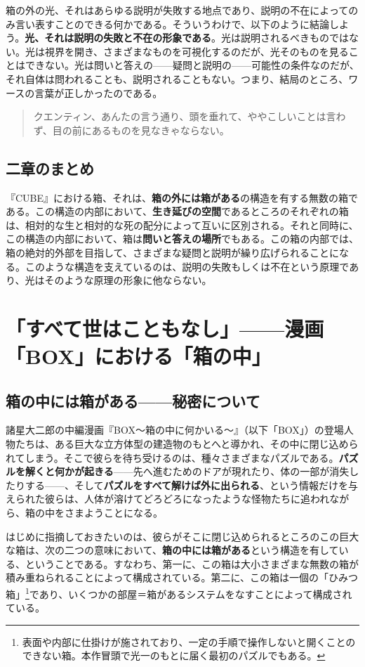 \documentclass[9pt,b5j,twoside,twocolumn]{utarticle}
\begin{document}
箱の外の光、それはあらゆる説明が失敗する地点であり、説明の不在によってのみ言い表すことのできる何かである。そういうわけで、以下のように結論しよう。\textbf{光、それは説明の失敗と不在の形象である}。光は説明されるべきものではない。光は視界を開き、さまざまなものを可視化するのだが、光そのものを見ることはできない。光は問いと答えの------疑問と説明の------可能性の条件なのだが、それ自体は問われることも、説明されることもない。つまり、結局のところ、ワースの言葉が正しかったのである。

\begin{quote}
クエンティン、あんたの言う通り、頭を垂れて、ややこしいことは言わず、目の前にあるものを見なきゃならない。
\end{quote}

\subsection*{二章のまとめ}

『CUBE』における箱、それは、\textbf{箱の外には箱がある}の構造を有する無数の箱である。この構造の内部において、\textbf{生き延びの空間}であるところのそれぞれの箱は、相対的な生と相対的な死の配分によって互いに区別される。それと同時に、この構造の内部において、箱は\textbf{問いと答えの場所}でもある。この箱の内部では、箱の絶対的外部を目指して、さまざまな疑問と説明が繰り広げられることになる。このような構造を支えているのは、説明の失敗もしくは不在という原理であり、光はそのような原理の形象に他ならない。

\section{「すべて世はこともなし」------漫画「BOX」における「箱の中」}


\subsection{\tbaselineshift =3.0pt 箱の中には箱がある------秘密について}
諸星大二郎の中編漫画『BOX～箱の中に何かいる～』（以下「BOX」）の登場人物たちは、ある巨大な立方体型の建造物のもとへと導かれ、その中に閉じ込められてしまう。そこで彼らを待ち受けるのは、種々さまざまなパズルである。\textbf{パズルを解くと何かが起きる}------先へ進むためのドアが現れたり、体の一部が消失したりする------、そして\textbf{パズルをすべて解けば外に出られる}、という情報だけを与えられた彼らは、人体が溶けてどろどろになったような怪物たちに追われながら、箱の中をさまようことになる。


はじめに指摘しておきたいのは、彼らがそこに閉じ込められるところのこの巨大な箱は、次の二つの意味において、\textbf{箱の中には箱がある}という構造を有している、ということである。すなわち、第一に、この箱は大小さまざまな無数の箱が積み重ねられることによって構成されている。第二に、この箱は一個の「ひみつ箱」\footnote{表面や内部に仕掛けが施されており、一定の手順で操作しないと開くことのできない箱。本作冒頭で光一のもとに届く最初のパズルでもある。}であり、いくつかの部屋＝箱があるシステムをなすことによって構成されている。
\end{document}
